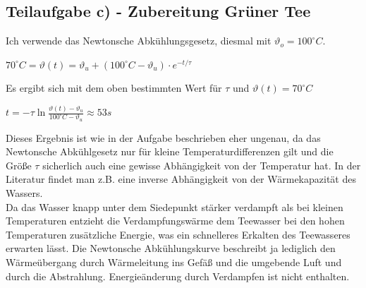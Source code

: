 \documentclass{article}
\begin{document}
\subsection*{Teilaufgabe c) - Zubereitung Grüner Tee}
Ich verwende das Newtonsche Abkühlungsgesetz, diesmal mit $\vartheta_o=100^\circ C$.
\begin{center}
	$70^\circ C = \vartheta (t) = \vartheta_u + (100^\circ C - \vartheta_u ) \cdot e^{-t/\tau}$ 
\end{center}
Es ergibt sich mit dem oben bestimmten Wert für $\tau$ und $\vartheta (t) = 70^\circ C$
\begin{center}
	$t=-\tau \ln{\frac{\vartheta (t) - \vartheta_u}{ 100^\circ C - \vartheta_u}} \approx 53 s$
\end{center}
Dieses Ergebnis ist wie in der Aufgabe beschrieben eher ungenau, da das Newtonsche Abkühlgesetz nur für kleine Temperaturdifferenzen gilt und 
die Größe $\tau$ sicherlich auch eine gewisse Abhängigkeit von der Temperatur hat. In der Literatur findet man z.B. eine inverse Abhängigkeit von der Wärmekapazität des Wassers.  
\\
Da das Wasser knapp unter dem Siedepunkt stärker verdampft als bei kleinen Temperaturen entzieht die Verdampfungswärme dem Teewasser bei den hohen Temperaturen zusätzliche Energie, 
was ein schnelleres Erkalten des Teewasseres erwarten lässt. 
Die Newtonsche Abkühlungskurve beschreibt ja lediglich den Wärmeübergang durch Wärmeleitung ins Gefäß und die umgebende Luft und durch die Abstrahlung. 
Energieänderung durch Verdampfen ist nicht enthalten.      
\end{document}
